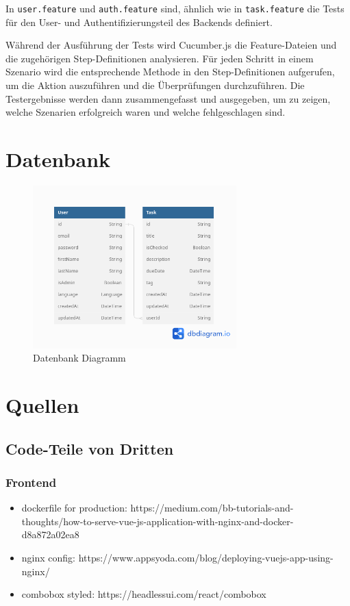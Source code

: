 \documentclass[a4paper, 12pt]{article}
\begin{document}
    In {\tt user.feature} und {\tt auth.feature} sind, ähnlich wie in {\tt task.feature} die Tests für den User- und Authentifizierungsteil des Backends definiert.

    Während der Ausführung der Tests wird Cucumber.js die Feature-Dateien und die zugehörigen Step-Definitionen analysieren. Für jeden Schritt
    in einem Szenario wird die entsprechende Methode in den Step-Definitionen aufgerufen, um die Aktion auszuführen und die Überprüfungen
    durchzuführen. Die Testergebnisse werden dann zusammengefasst und ausgegeben, um zu zeigen, welche Szenarien erfolgreich waren und welche
    fehlgeschlagen sind.

    \section{Datenbank}
    \begin{figure}[H]
        \center\includegraphics[width=0.7\textwidth]{../images/database}
        \caption{Datenbank Diagramm}\label{fig:figure}
    \end{figure}

    \newpage
    \section{Quellen}
    \subsection{Code-Teile von Dritten}
    \subsubsection{Frontend}
\begin{itemize}
  \item dockerfile for production: https://medium.com/bb-tutorials-and-thoughts/how-to-serve-vue-js-application-with-nginx-and-docker-d8a872a02ea8
  \item nginx config: https://www.appsyoda.com/blog/deploying-vuejs-app-using-nginx/
  \item combobox styled: https://headlessui.com/react/combobox
\end{itemize}
\end{document}

